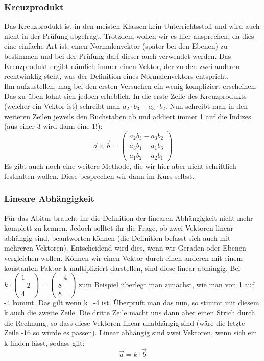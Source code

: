 \subsubsection{Kreuzprodukt}
Das Kreuzprodukt ist in den meisten Klassen kein Unterrichtsstoff und wird auch nicht in der Prüfung abgefragt. Trotzdem wollen wir es hier ansprechen, da dies eine einfache Art ist, einen Normalenvektor (später bei den Ebenen) zu bestimmen und bei der Prüfung darf dieser auch verwendet werden. Das Kreuzprodukt ergibt nämlich immer einen Vektor, der zu den zwei anderen rechtwinklig steht, was der Definition eines Normalenvektors entspricht.\\
Ihn aufzustellen, mag bei den ersten Versuchen ein wenig kompliziert erscheinen. Das zu üben lohnt sich jedoch erheblich. In die erste Zeile des Kreuzprodukts (welcher ein Vektor ist) schreibt man \(a_2\cdot b_3-a_3\cdot b_2\). Nun schreibt man in den weiteren Zeilen jeweils den Buchstaben ab und addiert immer 1 auf die Indizes (aus einer 3 wird dann eine 1!):
\[\vec{a} \times \vec{b}=
\begin{pmatrix}
 a_2b_3-a_3b_2\\
 a_3b_1-a_1b_3\\
 a_1b_2-a_2b_1
\end{pmatrix}\]
Es gibt auch noch eine weitere Methode, die wir hier aber nicht schriftlich festhalten wollen. Diese besprechen wir dann im Kurs selbst.

\subsubsection{Lineare Abhängigkeit}
Für das Abitur braucht ihr die Definition der linearen Abhängigkeit nicht mehr komplett zu kennen. Jedoch solltet ihr die Frage, ob zwei Vektoren linear abhängig sind, beantworten können (die Definition befasst sich auch mit mehreren Vektoren). Entscheidend wird dies, wenn wir Geraden oder Ebenen vergleichen wollen. Können wir einen Vektor durch einen anderen mit einem konstanten Faktor k multipliziert darstellen, sind diese linear abhängig. Bei 
\(k\cdot \begin{pmatrix}
 1\\
 -2\\
 4
\end{pmatrix}=\begin{pmatrix}
 -4\\
 8\\
 8
\end{pmatrix}\)
zum Beispiel überlegt man zunächst, wie man von 1 auf -4 kommt. Das gilt wenn k=-4 ist. Überprüft man das nun, so stimmt mit diesem k auch die zweite Zeile. Die dritte Zeile macht uns dann aber einen Strich durch die Rechnung, so dass diese Vektoren linear unabhängig sind (wäre die letzte Zeile -16 so würde es passen). Linear abhängig sind zwei Vektoren, wenn sich ein k finden lässt, sodass gilt:
\[\vec{a}=k\cdot \vec{b}\]
